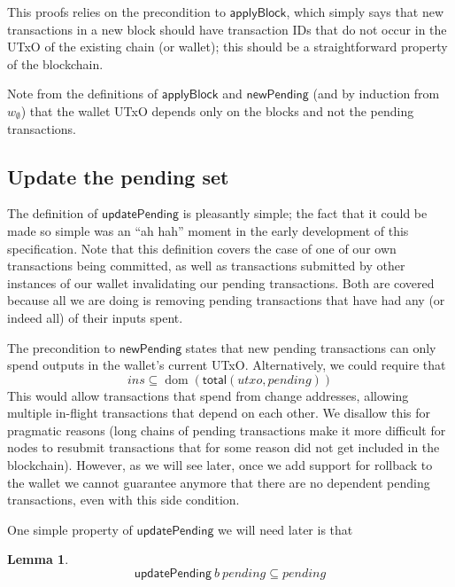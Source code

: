 \documentclass{article}
\DeclareMathOperator{\dom}{dom}
\newtheorem{lemma}{Lemma}[section] %
\numberwithin{equation}{lemma}
\begin{document}
%
This proofs relies on the precondition to $\mathsf{applyBlock}$, which simply
says that new transactions in a new block should have transaction IDs that do
not occur in the UTxO of the existing chain (or wallet); this should be a
straightforward property of the blockchain.

Note from the definitions of $\mathsf{applyBlock}$ and $\mathsf{newPending}$
(and by induction from $w_\emptyset$) that the wallet UTxO depends only on the
blocks and not the pending transactions.

\subsection{Update the pending set}
\label{sec:updatePending}

The definition of $\mathsf{updatePending}$ is pleasantly simple; the fact that
it could be made so simple was an ``ah hah'' moment in the early development of
this specification. Note that this definition covers the case of one of our own
transactions being committed, as well as transactions submitted by other
instances of our wallet invalidating our pending transactions. Both are covered
because all we are doing is removing pending transactions that have had any (or
indeed all) of their inputs spent.

The precondition to $\mathsf{newPending}$ states that new pending transactions
can only spend outputs in the wallet's current UTxO. Alternatively, we could
require that
%
\begin{equation*}
\mathit{ins} \subseteq \dom (\mathsf{total}(utxo, pending))
\end{equation*}
%
This would allow transactions that spend from change addresses, allowing
multiple in-flight transactions that depend on each other. We disallow this
for pragmatic reasons (long chains of pending transactions make it more
difficult for nodes to resubmit transactions that for some reason did not
get included in the blockchain). However, as we will see later, once
we add support for rollback to the wallet we cannot guarantee anymore that
there are no dependent pending transactions, even with this side condition.

One simple property of $\mathsf{updatePending}$ we will need later is that
%
\begin{lemma} \label{lem:updatePending_is_filter}
\begin{equation*}
\mathsf{updatePending} ~ b ~ \mathit{pending} \subseteq \mathit{pending}
\end{equation*}
\end{lemma}
\end{document}
